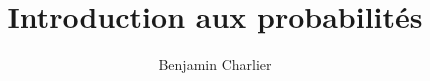 \documentclass[12pt]{book}
\title{Introduction aux probabilités}
\author{Benjamin Charlier}
\begin{document}
\maketitle
\tableofcontents


\tikzexternaldisable








%
\end{document}
